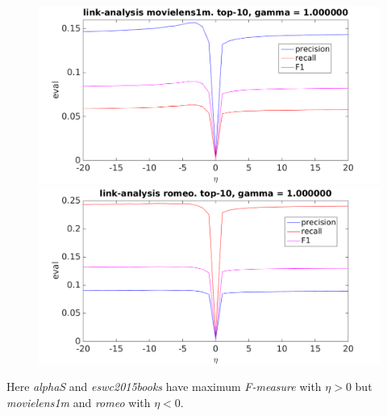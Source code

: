 \begin{figure}[h!]
\centering
\begin{minipage}{.5\textwidth}
    \centering
    \includegraphics[width=\linewidth]{fig/link_eta/movielens_link_eta.png}
\end{minipage}%
\begin{minipage}{.5\textwidth}
    \centering
    \includegraphics[width=\linewidth]{fig/link_eta/romeo_link_eta.png}
\end{minipage}
\end{figure}

\FloatBarrier

Here \textit{alphaS} and \textit{eswc2015books} have maximum \textit{F-measure} with $\eta > 0$ but \textit{movielens1m} and \textit{romeo} with $\eta < 0$.


\newpage

